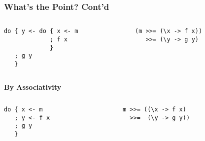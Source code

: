 \documentclass{beamer}
\begin{document}
\begin{frame}[fragile]
\frametitle{What's the Point? Cont'd}
\vspace{-0.5cm}
\begin{columns}[t]
  \begin{column}{5cm}
\begin{lstlisting}
do { y <- do { x <- m
             ; f x
             }
   ; g y 
   }
\end{lstlisting}
  \end{column}
  \begin{column}{5cm}
\begin{lstlisting}
(m >>= (\x -> f x)) 
   >>= (\y -> g y)
\end{lstlisting}
  \end{column}
\end{columns}

\pause

\begin{center}
\textbf{By Associativity}
\end{center}

\vspace{-0.5cm}
\begin{columns}[t]
  \begin{column}{5cm}
{
\begin{lstlisting}
do { x <- m
   ; y <- f x
   ; g y 
   }
\end{lstlisting}
}
  \end{column}
  \begin{column}{5cm}
{
\begin{lstlisting}
m >>= ((\x -> f x) 
  >>=  (\y -> g y))
\end{lstlisting}
}
  \end{column}
\end{columns}
\end{frame}




\end{document}
